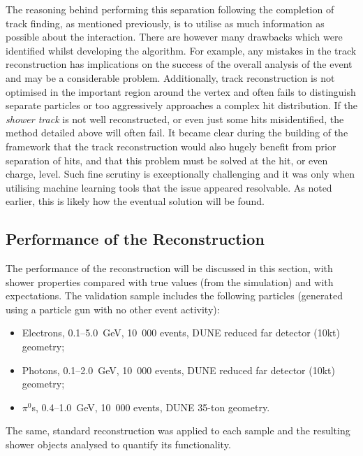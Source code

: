 The reasoning behind performing this separation following the completion of track finding, as mentioned previously, is to utilise as much information as possible about the interaction.  There are however many drawbacks which were identified whilst developing the algorithm.  For example, any mistakes in the track reconstruction has implications on the success of the overall analysis of the event and may be a considerable problem.  Additionally, track reconstruction is not optimised in the important region around the vertex and often fails to distinguish separate particles or too aggressively approaches a complex hit distribution.  If the \textit{shower track} is not well reconstructed, or even just some hits misidentified, the method detailed above will often fail.  It became clear during the building of the framework that the track reconstruction would also hugely benefit from prior separation of hits, and that this problem must be solved at the hit, or even charge, level.  Such fine scrutiny is exceptionally challenging and it was only when utilising machine learning tools that the issue appeared resolvable.  As noted earlier, this is likely how the eventual solution will be found.

\subsection{Performance of the Reconstruction}\label{sec:ReconstructionPerformance}

The performance of the reconstruction will be discussed in this section, with shower properties compared with true values (from the simulation) and with expectations.  The validation sample includes the following particles (generated using a particle gun with no other event activity):
\begin{itemize}
  \item Electrons, 0.1--5.0~GeV, 10~000 events, DUNE reduced far detector (10kt) geometry;
  \item Photons, 0.1--2.0~GeV, 10~000 events, DUNE reduced far detector (10kt) geometry;
  \item $\pi^0$s, 0.4--1.0~GeV, 10~000 events, DUNE 35-ton geometry.
\end{itemize}
The same, standard reconstruction was applied to each sample and the resulting shower objects analysed to quantify its functionality.


